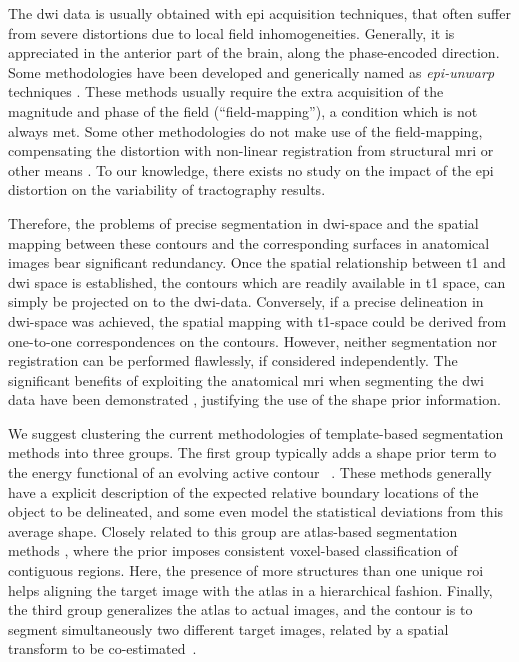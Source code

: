 The \ac{dwi} data is usually obtained with \ac{epi}
acquisition techniques, that often suffer from severe distortions due to 
local field inhomogeneities. Generally, it is appreciated in the anterior
part of the brain, along the phase-encoded direction. Some methodologies have
been developed and generically named as \emph{\ac{epi}-unwarp} techniques
\cite{holland_efficient_2010,hsu_correction_2009,jezzard_characterization_2005,
reber_correction_2005}. These methods usually 
require the extra acquisition of the magnitude and phase of
the field (``field-mapping''), a condition which is not always met. Some other 
methodologies do not make use of the field-mapping, compensating the distortion
with non-linear registration from structural \ac{mri} or other means
\citep{andersson_modeling_2001}. To our knowledge, there exists no study
on the impact of the \ac{epi} distortion on the variability of tractography
results. 

Therefore, the problems of precise segmentation in \ac{dwi}-space and the 
spatial mapping between these contours and the corresponding surfaces in 
anatomical images bear significant redundancy. Once the spatial relationship 
between \ac{t1} and \ac{dwi} space is established, the contours which are 
readily available in \ac{t1} space, can simply be projected on to the 
\ac{dwi}-data. Conversely, if a precise delineation in \ac{dwi}-space 
was achieved, the spatial mapping with \ac{t1}-space could be derived 
from one-to-one correspondences on the contours. However, neither segmentation 
nor registration can be performed flawlessly, if considered independently. 
The significant benefits of exploiting the anatomical \ac{mri} when 
segmenting the \ac{dwi} data have been demonstrated \cite{zollei_improved_2010}, 
justifying the use of the shape prior information. 

We suggest clustering the current methodologies of template-based segmentation 
methods into three groups. The first group typically adds a shape prior term to 
the energy functional of an evolving active contour~\citep{Rousson2002,Chen2002,
Paragios2003,Vemuri2003a,Yezzi2003a,Gastaud2004,Chan2005,Cremers2006,Bresson2006a,
Ayvaci2007,Schmid2008} 
{\color{red}{(FIXME:I would select from here the most important,
removing directly those appearing in conferences and never published on journal. Better
if we found a review paper/book chapter. I don't like so many references on a row)}}.
These methods generally have a explicit description of the expected relative boundary 
locations of the object to be delineated, and some even model the statistical deviations
from this average shape. Closely related to this group are atlas-based segmentation
methods \citep{Pohl2005,Pohl2006,Wang2006,Gorthi2009,Gorthi2011}, where the prior 
imposes consistent voxel-based classification of contiguous regions. Here, the 
presence of more structures than one unique \ac{roi} helps aligning the target image 
with the atlas in a hierarchical fashion. Finally, the third group generalizes 
the atlas to actual images, and the contour is to segment simultaneously two 
different target images, related by a spatial transform to be co-estimated~\citep{Wyatt2003,
Yezzi2003}.

